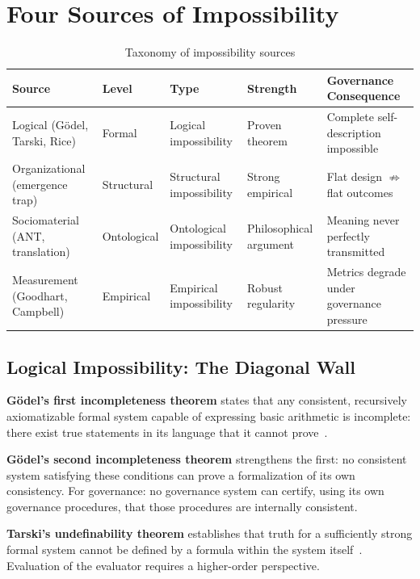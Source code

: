 \documentclass[12pt,a4paper]{article}
\begin{document}
\section{Four Sources of Impossibility}

\begin{table}[ht]
\centering
\caption{Taxonomy of impossibility sources}
\label{tab:taxonomy}
\small
\begin{tabular}{@{}llllp{3.7cm}@{}}
\toprule
Source & Level & Type & Strength & Governance Consequence \\
\midrule
Logical (G\"{o}del, Tarski, Rice) & Formal & Logical impossibility & Proven theorem & Complete self-description impossible \\
Organizational (emergence trap) & Structural & Structural impossibility & Strong empirical & Flat design $\not\Rightarrow$ flat outcomes \\
Sociomaterial (ANT, translation) & Ontological & Ontological impossibility & Philosophical argument & Meaning never perfectly transmitted \\
Measurement (Goodhart, Campbell) & Empirical & Empirical impossibility & Robust regularity & Metrics degrade under governance pressure \\
\bottomrule
\end{tabular}
\end{table}

\subsection{Logical Impossibility: The Diagonal Wall}

\textbf{G\"{o}del's first incompleteness theorem} states that any consistent,
recursively axiomatizable formal system capable of expressing basic arithmetic
is incomplete: there exist true statements in its language that it cannot
prove~\cite{Godel1931}.

\textbf{G\"{o}del's second incompleteness theorem} strengthens the first: no
consistent system satisfying these conditions can prove a formalization of its
own consistency. For governance: no governance system can certify, using its
own governance procedures, that those procedures are internally consistent.

\textbf{Tarski's undefinability theorem} establishes that truth for a
sufficiently strong formal system cannot be defined by a formula within the
system itself~\cite{Tarski1933}. Evaluation of the evaluator requires a
higher-order perspective.
\end{document}
